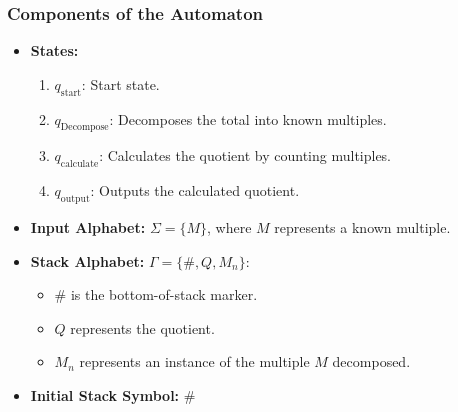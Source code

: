 \documentclass[11pt]{article}
\begin{document}
\subsubsection*{Components of the Automaton}
\begin{itemize}
    \item \textbf{States:}
    \begin{enumerate}
        \item \(q_{\text{start}}\): Start state.
        \item \(q_{\text{Decompose}}\): Decomposes the total into known multiples.
        \item \(q_{\text{calculate}}\): Calculates the quotient by counting multiples.
        \item \(q_{\text{output}}\): Outputs the calculated quotient.
    \end{enumerate}
    \item \textbf{Input Alphabet:} \(\Sigma = \{M\}\), where \(M\) represents a known multiple.
    \item \textbf{Stack Alphabet:} \(\Gamma = \{ \#, Q, M_n \}\):
    \begin{itemize}
        \item \(\#\) is the bottom-of-stack marker.
        \item \(Q\) represents the quotient.
        \item \(M_n\) represents an instance of the multiple \(M\) decomposed.
    \end{itemize}
    \item \textbf{Initial Stack Symbol:} \(\#\)
\end{itemize}
\end{document}
